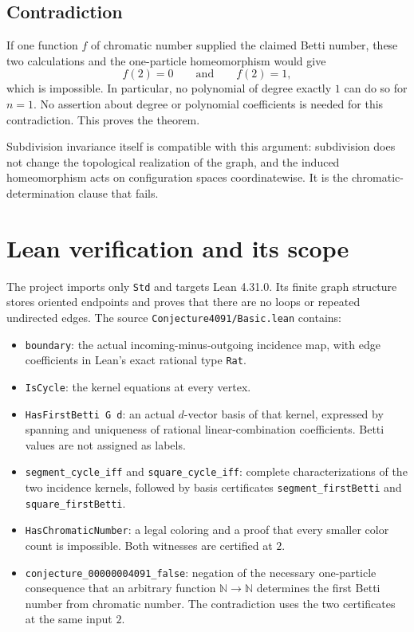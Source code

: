 \documentclass[11pt]{article}
\begin{document}
\subsection{Contradiction}
If one function $f$ of chromatic number supplied the claimed Betti number,
these two calculations and the one-particle homeomorphism would give
\[
                f(2)=0\qquad\text{and}\qquad f(2)=1,
\]
which is impossible. In particular, no polynomial of degree exactly $1$
can do so for $n=1$. No assertion about degree or polynomial coefficients
is needed for this contradiction. This proves the theorem.

Subdivision invariance itself is compatible with this argument: subdivision
does not change the topological realization of the graph, and the induced
homeomorphism acts on configuration spaces coordinatewise. It is the
chromatic-determination clause that fails.

\section{Lean verification and its scope}
The project imports only \texttt{Std} and targets Lean 4.31.0. Its finite
graph structure stores oriented endpoints and proves that there are no
loops or repeated undirected edges.
The source \texttt{Conjecture4091/Basic.lean} contains:
\begin{itemize}
\item \texttt{boundary}: the actual incoming-minus-outgoing incidence map,
with edge coefficients in Lean's exact rational type \texttt{Rat}.
\item \texttt{IsCycle}: the kernel equations at every vertex.
\item \texttt{HasFirstBetti G d}: an actual $d$-vector basis of that kernel,
expressed by spanning and uniqueness of rational linear-combination
coefficients. Betti values are not assigned as labels.
\item \texttt{segment\_cycle\_iff} and \texttt{square\_cycle\_iff}: complete
characterizations of the two incidence kernels, followed by basis
certificates \texttt{segment\_firstBetti} and \texttt{square\_firstBetti}.
\item \texttt{HasChromaticNumber}: a legal coloring and a proof that every
smaller color count is impossible. Both witnesses are certified at $2$.
\item {\small\texttt{conjecture\_00000004091\_false}}: negation of the necessary
one-particle consequence that an arbitrary function
$\mathbb N\to\mathbb N$ determines the first Betti number from chromatic
number. The contradiction uses the two certificates at the same input $2$.
\end{itemize}
\end{document}
